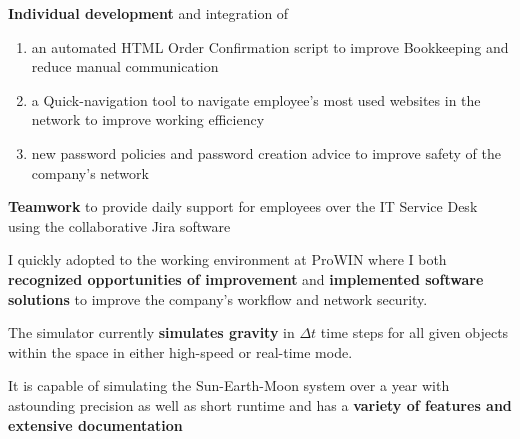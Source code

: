 \documentclass[]{jonas-cv}
\begin{document}
\begin{minipage}[t]{0.63\textwidth} 



\sectionsep

\begin{tightemize}
    \item \textbf{Individual development} and integration of
    \begin{enumerate}
        \parskip=0.0em
        \item an automated HTML Order Confirmation script to improve Bookkeeping and reduce manual communication
        \item a Quick-navigation tool to navigate employee's most used websites in the network to improve working efficiency
        \item new password policies and password creation advice to improve safety of the company's network
    \end{enumerate}
    \item \textbf{Teamwork} to provide daily support for employees over the IT Service Desk using the collaborative Jira software
    \vspace{2mm}
    
    \item [\faicon{angle-double-right}] I quickly adopted to the working environment at ProWIN where I both \textbf{recognized opportunities of improvement} 
    and \textbf{implemented software solutions} to improve the company's workflow and network security.
\end{tightemize}
\largesectionsep




\begin{tightemize}
    \item The simulator currently \textbf{simulates gravity} in $\Delta t$ time steps for all given objects within the space in either high-speed or real-time mode.
    \item It is capable of simulating the Sun-Earth-Moon system over a year with astounding precision as well as short runtime and has a \textbf{variety of features and extensive documentation}
\end{tightemize}
\largesectionsep


\end{minipage}
\end{document}
